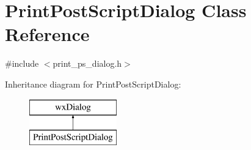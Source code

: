 \hypertarget{a00117}{\section{Print\-Post\-Script\-Dialog Class Reference}
\label{a00117}
}


{\ttfamily \#include $<$print\-\_\-ps\-\_\-dialog.\-h$>$}

Inheritance diagram for Print\-Post\-Script\-Dialog\-:\begin{figure}[H]
\begin{center}
\leavevmode
\includegraphics[height=2.000000cm]{a00117}
\end{center}
\end{figure}
